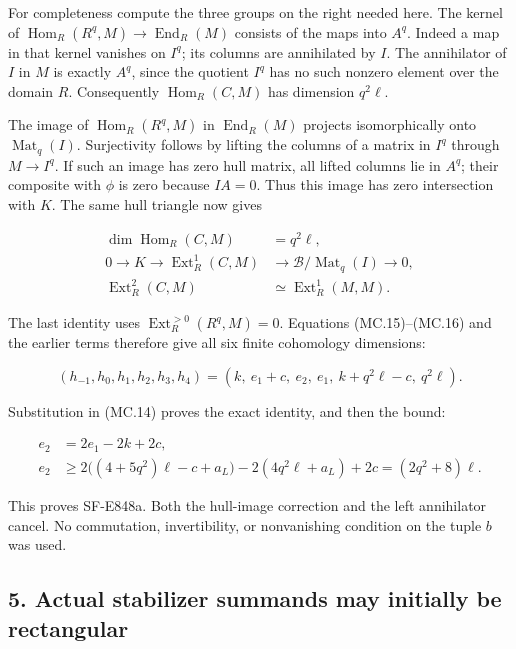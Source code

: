 For completeness compute the three groups on the right needed here.
The kernel of \(\operatorname{Hom}_R(R^q,M)\to
\operatorname{End}_R(M)\) consists of the maps into \(A^q\).
Indeed a map in that kernel vanishes on \(I^q\); its columns are
annihilated by \(I\). The annihilator of \(I\) in \(M\) is exactly
\(A^q\), since the quotient \(I^q\) has no such nonzero element
over the domain \(R\). Consequently
\(\operatorname{Hom}_R(C,M)\) has dimension \(q^2\ell\).

The image of \(\operatorname{Hom}_R(R^q,M)\) in
\(\operatorname{End}_R(M)\) projects isomorphically onto
\(\operatorname{Mat}_q(I)\). Surjectivity follows by lifting the
columns of a matrix in \(I^q\) through \(M\to I^q\). If such
an image has zero hull matrix, all lifted columns lie in \(A^q\);
their composite with \(\phi\) is zero because \(I A=0\).
Thus this image has zero intersection with \(K\). The same hull
triangle now gives

\[
 \begin{split}
 \dim\operatorname{Hom}_R(C,M)&=q^2\ell,\\
 0\longrightarrow K\longrightarrow\operatorname{Ext}^1_R(C,M)
      &\longrightarrow\mathcal B/\operatorname{Mat}_q(I)
                      \longrightarrow0,\\
 \operatorname{Ext}^2_R(C,M)&\simeq\operatorname{Ext}^1_R(M,M).
 \end{split}
 \tag{MC.16}
\]

The last identity uses \(\operatorname{Ext}^{>0}_R(R^q,M)=0\).
Equations (MC.15)--(MC.16) and the earlier terms therefore give all
six finite cohomology dimensions:

\[
 (h_{-1},h_0,h_1,h_2,h_3,h_4)
   =(k,\ e_1+c,\ e_2,\ e_1,\ k+q^2\ell-c,\ q^2\ell).
 \tag{MC.17}
\]

Substitution in (MC.14) proves the exact identity, and then the bound:

\[
 \begin{split}
 e_2&=2e_1-2k+2c,\\
 e_2&\ge2\bigl((4+5q^2)\ell-c+a_L\bigr)
                -2(4q^2\ell+a_L)+2c
       =(2q^2+8)\ell.
 \end{split}
 \tag{MC.18}
\]

This proves SF-E848a. Both the hull-image correction and the left
annihilator cancel. No commutation, invertibility, or nonvanishing
condition on the tuple \(b\) was used.

\subsection{5. Actual stabilizer summands may initially be rectangular}\label{SF-E848:s5}

